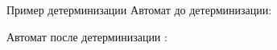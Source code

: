 \begin{frame}{Пример детерминизации}
    Автомат до детерминизации:


    Автомат после детерминизации%
    :

\end{frame}